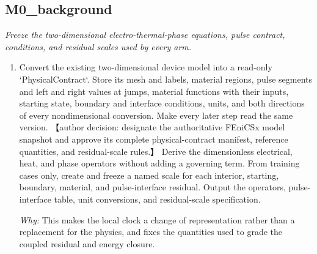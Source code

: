 \documentclass[10pt,a4paper]{article}
\begin{document}
\subsection*{M0\_background}
\emph{Freeze the two-dimensional electro-thermal-phase equations, pulse contract, conditions, and residual scales used by every arm.}
\begin{enumerate}[leftmargin=*,start=1]
  \item Convert the existing two-dimensional device model into a read-only `PhysicalContract`. Store its mesh and labels, material regions, pulse segments and left and right values at jumps, material functions with their inputs, starting state, boundary and interface conditions, units, and both directions of every nondimensional conversion. Make every later step read the same version. 【author decision: designate the authoritative FEniCSx model snapshot and approve its complete physical-contract manifest, reference quantities, and residual-scale rules.】 Derive the dimensionless electrical, heat, and phase operators without adding a governing term. From training cases only, create and freeze a named scale for each interior, starting, boundary, material, and pulse-interface residual. Output the operators, pulse-interface table, unit conversions, and residual-scale specification.
\par\emph{Why:} This makes the local clock a change of representation rather than a replacement for the physics, and fixes the quantities used to grade the coupled residual and energy closure.
\end{enumerate}
\end{document}
